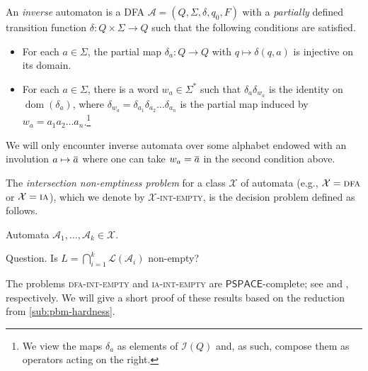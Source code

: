 \documentclass[anonymous,letter,UKenglish,cleveref,autoref,thm-restate]{lipics-v2021}
\makeatletter
\newcommand{\dom}{\operatorname{dom}}
\newcommand{\PSPACE}{\ensuremath{\mathsf{PSPACE}}\xspace}
\newcommand{\ISym}{\cI}
\newcommand\nindent{.5pt}
\newcommand\noverline[1]{\kern\nindent\overline{\kern-\nindent#1\kern-\nindent}\kern\nindent}
\newcommand{\ov}[1]{\noverline{#1}}
\newcommand{\cA}{\mathcal{A}}
\newcommand{\cL}{\mathcal{L}}
\newcommand{\cI}{\mathcal{I}}
\newcommand{\cX}{\mathcal{X}}
\theoremstyle{plain}
\theoremstyle{plain}
\providecommand\iitem{}
\providecommand\qitem{}
\newcommand\decproblem@iitem@label{\rlap{Input.}\phantom{Question.}}
\newcommand\decproblem@qitem@label{Question.}
\newenvironment{decproblem}{\begin{description}\begin{samepage}\renewcommand{\iitem}{\item[\decproblem@iitem@label]}\renewcommand{\qitem}{\item[\decproblem@qitem@label]}}{\end{samepage}\end{description}}
\newcommand{\prob}[1]{\textup{\textsc{#1}}\xspace}
\newcommand{\dIEmpty}[1]{\prob{{#1}-int-empty}}
\makeatother
\begin{document}
An \emph{inverse} automaton is a DFA $\cA = (Q,\Sigma, \delta, q_0, F)$ with a \emph{partially} defined transition function $\delta\colon Q  \times \Sigma \to Q$ such that the following conditions are satisfied.
\begin{itemize}
  \item For each $a \in \Sigma$, the partial map $\delta_a\colon Q \to Q$ with $q \mapsto \delta(q,a)$ is injective on its domain. 
  \item For each $a \in \Sigma$, there is a word $w_a \in \Sigma^\ast$ such that $\delta_a \delta_{w_a}$ is the identity on $\dom(\delta_a)$, where $\delta_{w_a} = \delta_{a_1}\delta_{a_2} \dotsc \delta_{a_n}$ is the partial map induced by $w_a = a_1 a_2 \dotsc a_n$.\footnote{We view the maps $\delta_a$ as elements of $\ISym(Q)$ and, as such, compose them as operators acting on the right.}
\end{itemize}
\begin{remark}
  We will only encounter inverse automata over some alphabet endowed with an involution $a \mapsto \ov a$ where one can take $w_a = \ov a$ in the second condition above.
\end{remark}

The \emph{intersection non-emptiness problem} for a class $\cX$ of automata (e.g., $\cX = \textsc{dfa}$ or $\cX = \textsc{ia}$), which we denote by \dIEmpty{$\cX$}, is the decision problem defined as follows.

\begin{decproblem}
  \iitem Automata $\cA_1, \dotsc, \cA_k \in \cX$.
  \qitem Is $L = \bigcap_{i=1}^k\cL(\cA_i)$ non-empty?
\end{decproblem}

The problems \dIEmpty{dfa} and \dIEmpty{ia} are \PSPACE-complete; see \cite{koz77} and \cite{BirgetMMW94}, respectively.
We will give a short proof of these results based on the reduction from \cref{sub:pbm-hardness}.
\end{document}
